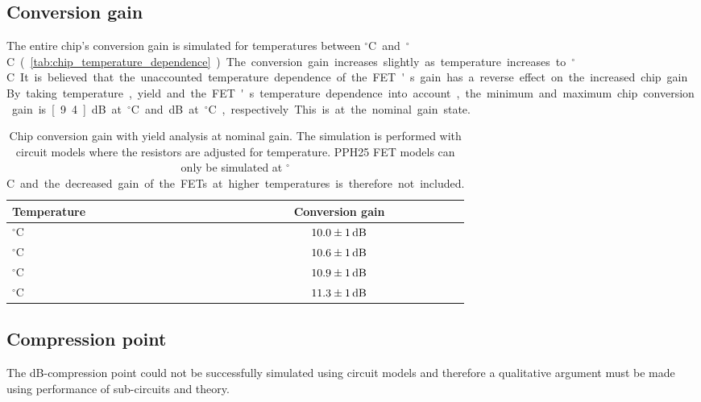 		\subsection{Conversion gain}
			The entire chip's conversion gain is simulated for temperatures between \unit[-40]{$^\circ$C} and \unit[85]{$^\circ$C} (\autoref{tab:chip_temperature_dependence}). The conversion gain increases slightly as temperature increases to \unit[85]{$^\circ$C}. It is believed that the unaccounted temperature dependence of the FET's gain has a reverse effect on the increased chip gain. %

			
		By taking temperature, yield and the FET's temperature dependence into account, the minimum and maximum chip conversion gain is \unit[9.4]{dB} at \unit[55]{$^\circ$C} and \unit[12]{dB} at \unit[-40]{$^\circ$C}, respectively. This is at the nominal gain state.


		\begin{table}[h!]
				\caption[Chip conversion gain temperature dependence]{Chip conversion gain with yield analysis at nominal gain. The simulation is performed with circuit models where the resistors are adjusted for temperature. PPH25 FET models can only be simulated at \unit[20]{$^\circ$C} and the decreased gain of the FETs at higher temperatures is therefore not included.}
				\label{tab:chip_temperature_dependence}
				\centering
				\begin{tabular}{ l c } \toprule %
					Temperature & Conversion gain \\\midrule
					\unit[-40]{$^\circ$C} 	& $\unit[10.0\pm1]{dB}$\\
					\unit[20]{$^\circ$C} 	& $\unit[10.6\pm1]{dB}$\\
					\unit[55]{$^\circ$C} 	& $\unit[10.9\pm1]{dB}$ \\
					\unit[85]{$^\circ$C}	& $\unit[11.3\pm1]{dB}$ \\\bottomrule
				\end{tabular}
			\end{table}			
	

		\subsection{Compression point}
		The \unit[1]{dB}-compression point could not be successfully simulated using circuit models and therefore a qualitative argument must be made using performance of sub-circuits and theory.
		
